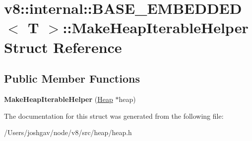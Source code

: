 \hypertarget{structv8_1_1internal_1_1_b_a_s_e___e_m_b_e_d_d_e_d_1_1_make_heap_iterable_helper}{}\section{v8\+:\+:internal\+:\+:B\+A\+S\+E\+\_\+\+E\+M\+B\+E\+D\+D\+ED$<$ T $>$\+:\+:Make\+Heap\+Iterable\+Helper Struct Reference}
\label{structv8_1_1internal_1_1_b_a_s_e___e_m_b_e_d_d_e_d_1_1_make_heap_iterable_helper}
\subsection*{Public Member Functions}
\begin{DoxyCompactItemize}
\item 
{\bfseries Make\+Heap\+Iterable\+Helper} (\hyperlink{classv8_1_1internal_1_1_heap}{Heap} $\ast$heap)\hypertarget{structv8_1_1internal_1_1_b_a_s_e___e_m_b_e_d_d_e_d_1_1_make_heap_iterable_helper_a02dfee0c356276e368486466de8b754f}{}\label{structv8_1_1internal_1_1_b_a_s_e___e_m_b_e_d_d_e_d_1_1_make_heap_iterable_helper_a02dfee0c356276e368486466de8b754f}

\end{DoxyCompactItemize}


The documentation for this struct was generated from the following file\+:\begin{DoxyCompactItemize}
\item 
/\+Users/joshgav/node/v8/src/heap/heap.\+h\end{DoxyCompactItemize}
